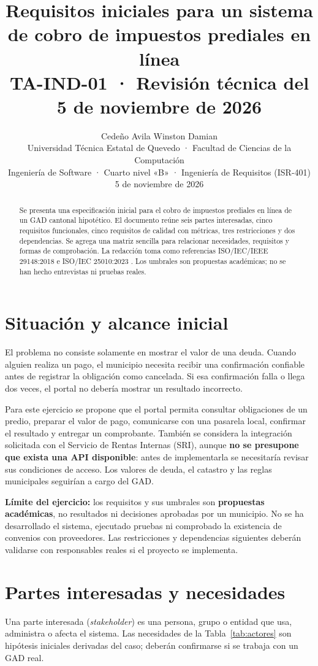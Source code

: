 \documentclass[10pt,onecolumn]{IEEEtran}
\title{Requisitos iniciales para un sistema de cobro de impuestos prediales en línea\\
\large TA-IND-01 · Revisión técnica del 5 de noviembre de 2026}
\author{Cedeño Avila Winston Damian\\
{\small Universidad Técnica Estatal de Quevedo · Facultad de Ciencias de la Computación}\\
{\small Ingeniería de Software · Cuarto nivel «B» · Ingeniería de Requisitos (ISR-401)}\\
{\small 5 de noviembre de 2026}}
\begin{document}
\maketitle

\begin{abstract}
Se presenta una especificación inicial para el cobro de impuestos prediales en línea de un GAD cantonal hipotético. El documento reúne seis partes interesadas, cinco requisitos funcionales, cinco requisitos de calidad con métricas, tres restricciones y dos dependencias. Se agrega una matriz sencilla para relacionar necesidades, requisitos y formas de comprobación. La redacción toma como referencias ISO/IEC/IEEE 29148:2018 e ISO/IEC 25010:2023 \cite{iso29148,iso25010}. Los umbrales son propuestas académicas; no se han hecho entrevistas ni pruebas reales.
\end{abstract}

\section{Situación y alcance inicial}
El problema no consiste solamente en mostrar el valor de una deuda. Cuando alguien realiza un pago, el municipio necesita recibir una confirmación confiable antes de registrar la obligación como cancelada. Si esa confirmación falla o llega dos veces, el portal no debería mostrar un resultado incorrecto.

Para este ejercicio se propone que el portal permita consultar obligaciones de un predio, preparar el valor de pago, comunicarse con una pasarela local, confirmar el resultado y entregar un comprobante. También se considera la integración solicitada con el Servicio de Rentas Internas (SRI), aunque \textbf{no se presupone que exista una API disponible}: antes de implementarla se necesitaría revisar sus condiciones de acceso. Los valores de deuda, el catastro y las reglas municipales seguirían a cargo del GAD.

\textbf{Límite del ejercicio:} los requisitos y sus umbrales son \textbf{propuestas académicas}, no resultados ni decisiones aprobadas por un municipio. No se ha desarrollado el sistema, ejecutado pruebas ni comprobado la existencia de convenios con proveedores. Las restricciones y dependencias siguientes deberán validarse con responsables reales si el proyecto se implementa.

\section{Partes interesadas y necesidades}
Una parte interesada (\emph{stakeholder}) es una persona, grupo o entidad que usa, administra o afecta el sistema. Las necesidades de la Tabla~\ref{tab:actores} son hipótesis iniciales derivadas del caso; deberán confirmarse si se trabaja con un GAD real.
\end{document}
